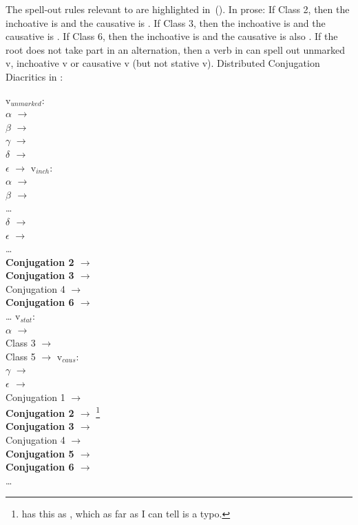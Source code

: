 The spell-out rules relevant to {\thif} are highlighted in~(\nextx). In prose: If Class 2, then the inchoative is {\tkal} and the causative is {\thif}. If Class 3, then the inchoative is {\tnif} and the causative is {\thif}. If Class 6, then the inchoative is {\thif} and the causative is also {\thif}. If the root does not take part in an alternation, then a verb in {\thif} can spell out unmarked v, inchoative v or causative v (but not stative v).
\pex Distributed Conjugation Diacritics in \citet[230]{arad05}: \label{ex:arad-classes2}
\begin{multicols}{2}
	\a  v$_{unmarked}$:\\
			$\alpha$ $\rightarrow$ {\tkal}\\
			$\beta$ $\rightarrow$ {\tnif}\\
			$\gamma$ $\rightarrow$ {\tpie}\\
			\textbf{$\delta$ $\rightarrow$ {\thif}}\\
			$\epsilon$ $\rightarrow$ {\thit}
	\a v$_{inch}$:\\
			$\alpha$ $\rightarrow$ {\tkal}\\
			\textbf{$\beta$ $\rightarrow$ {\tnif}} \\
			\dots \\
			\textbf{$\delta$ $\rightarrow$ {\thif}}\\
			$\epsilon$ $\rightarrow$ {\thit}\\
			\dots \\
			\textbf{Conjugation 2 $\rightarrow$ {\tkal}}\\
			\textbf{Conjugation 3 $\rightarrow$ {\tnif}}\\
			Conjugation 4 $\rightarrow$ {\thit}\\
			\textbf{Conjugation 6 $\rightarrow$ {\thif}}\\
			\dots
		\columnbreak
	\a v$_{stat}$:\\
			$\alpha$ $\rightarrow$ {\tkal}\\
			Class 3 $\rightarrow$ {\tkal}\\
			Class 5 $\rightarrow$ {\tkal}
	\a v$_{caus}$:\\
			$\gamma$ $\rightarrow$ {\tpie}\\
			\textbf{$\epsilon$ $\rightarrow$ {\thif}}\\
			Conjugation 1 $\rightarrow$ {\tkal}\\
			\textbf{Conjugation 2 $\rightarrow$ {\thif}}\footnote{\citet[231]{arad05} has this as {\tnif}, which as far as I can tell is a typo.}\\
			\textbf{Conjugation 3 $\rightarrow$ {\thif}}\\
			Conjugation 4 $\rightarrow$ {\tpie}\\
			\textbf{Conjugation 5 $\rightarrow$ {\thif}}\\
			\textbf{Conjugation 6 $\rightarrow$ {\thif}}\\
			\dots
	\end{multicols}
\xe


